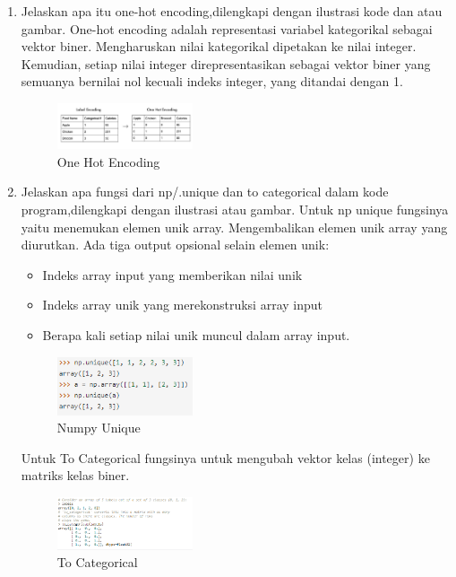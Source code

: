 \begin{enumerate}
	\item Jelaskan apa itu one-hot encoding,dilengkapi dengan ilustrasi kode dan atau gambar.
	\hfill\break
	One-hot encoding adalah representasi variabel kategorikal sebagai vektor biner. Mengharuskan nilai kategorikal dipetakan ke nilai integer. Kemudian, setiap nilai integer direpresentasikan sebagai vektor biner yang semuanya bernilai nol kecuali indeks integer, yang ditandai dengan 1.
	\begin{figure}[H]
		\includegraphics[width=4cm]{figures/1174087/6/4.png}
		\centering
		\caption{One Hot Encoding}
	\end{figure}

	\item Jelaskan apa fungsi dari np/.unique dan to categorical dalam kode program,dilengkapi dengan ilustrasi atau gambar.
	\hfill\break
	Untuk np unique fungsinya yaitu menemukan elemen unik array. Mengembalikan elemen unik array yang diurutkan. Ada tiga output opsional selain elemen unik:\\
	\begin{itemize}
		\item Indeks array input yang memberikan nilai unik
		\item Indeks array unik yang merekonstruksi array input
		\item Berapa kali setiap nilai unik muncul dalam array input.
	\end{itemize}
	\begin{figure}[H]
		\includegraphics[width=4cm]{figures/1174087/6/5.png}
		\centering
		\caption{Numpy Unique}
	\end{figure}

	Untuk  To Categorical fungsinya untuk mengubah vektor kelas (integer) ke matriks kelas biner.
	\begin{figure}[H]
		\includegraphics[width=4cm]{figures/1174087/6/6.png}
		\centering
		\caption{To Categorical}
	\end{figure}


\end{enumerate}
